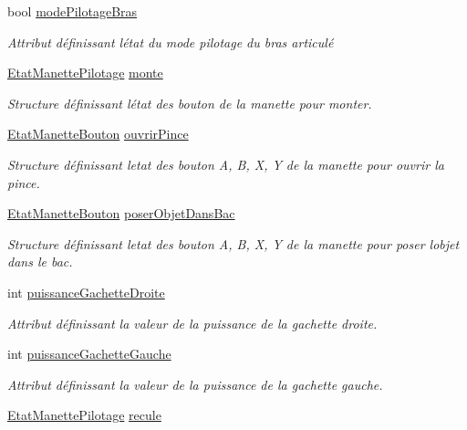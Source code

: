 \begin{DoxyCompactItemize}
bool \hyperlink{class_manette_acc2cd9afa45328c0da5c580e5c1a67db}{mode\+Pilotage\+Bras}
\begin{DoxyCompactList}\small\item\em Attribut définissant l\textquotesingle{}état du mode pilotage du bras articulé \end{DoxyCompactList}\item 
\hyperlink{struct_etat_manette_pilotage}{Etat\+Manette\+Pilotage} \hyperlink{class_manette_a63d9a39ea238e105d7491b87f0a3f87d}{monte}
\begin{DoxyCompactList}\small\item\em Structure définissant l\textquotesingle{}état des bouton de la manette pour monter. \end{DoxyCompactList}\item 
\hyperlink{struct_etat_manette_bouton}{Etat\+Manette\+Bouton} \hyperlink{class_manette_a066eacf19e615fd72690477c043e3703}{ouvrir\+Pince}
\begin{DoxyCompactList}\small\item\em Structure définissant l\textquotesingle{}etat des bouton A, B, X, Y de la manette pour ouvrir la pince. \end{DoxyCompactList}\item 
\hyperlink{struct_etat_manette_bouton}{Etat\+Manette\+Bouton} \hyperlink{class_manette_a93fc38a8ca8fbb1cc57cedbab059c56f}{poser\+Objet\+Dans\+Bac}
\begin{DoxyCompactList}\small\item\em Structure définissant l\textquotesingle{}etat des bouton A, B, X, Y de la manette pour poser l\textquotesingle{}objet dans le bac. \end{DoxyCompactList}\item 
int \hyperlink{class_manette_a135a3a6f567bbeeefd69b3a020f9f040}{puissance\+Gachette\+Droite}
\begin{DoxyCompactList}\small\item\em Attribut définissant la valeur de la puissance de la gachette droite. \end{DoxyCompactList}\item 
int \hyperlink{class_manette_ab777328c9b35454ab45ed5e0b0a5f234}{puissance\+Gachette\+Gauche}
\begin{DoxyCompactList}\small\item\em Attribut définissant la valeur de la puissance de la gachette gauche. \end{DoxyCompactList}\item 
\hyperlink{struct_etat_manette_pilotage}{Etat\+Manette\+Pilotage} \hyperlink{class_manette_a5ed3a0ab27f98cd11ecafe5f5b94e7e5}{recule}

\end{DoxyCompactItemize}
